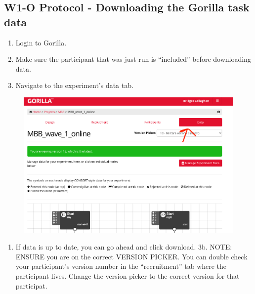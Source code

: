 \documentclass[]{book}
\providecommand{\tightlist}{%
  \setlength{\itemsep}{0pt}\setlength{\parskip}{0pt}}
\begin{document}
\hypertarget{w1-o-protocol---downloading-the-gorilla-task-data}{%
\subsection{W1-O Protocol - Downloading the Gorilla task data}\label{w1-o-protocol---downloading-the-gorilla-task-data}}

\begin{enumerate}
\def\labelenumi{\arabic{enumi}.}
\tightlist
\item
  Login to Gorilla.
\item
  Make sure the participant that was just run is ``included'' before downloading data.
\item
  Navigate to the experiment's data tab.
\end{enumerate}

\begin{figure}
\centering
\includegraphics{images/gorilla/6.png}
\caption{}
\end{figure}

\begin{enumerate}
\def\labelenumi{\arabic{enumi}.}
\setcounter{enumi}{2}
\tightlist
\item
  If data is up to date, you can go ahead and click download.
  3b. NOTE: ENSURE you are on the correct VERSION PICKER. You can double check your participant's version number in the ``recruitment'' tab where the participant lives. Change the version picker to the correct version for that participat.
\end{enumerate}
\end{document}
